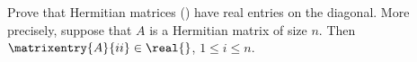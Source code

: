 Prove that Hermitian matrices () have real entries on the diagonal.  More precisely, suppose that $A$ is a Hermitian matrix of size $n$.  Then $\matrixentry{A}{ii}\in\real{\null}$, $1\leq i\leq n$.
